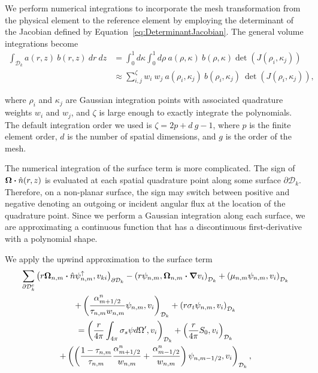 \documentclass[12pt]{article}
\begin{document}
We perform numerical integrations to incorporate the mesh transformation from the physical element to the reference element by employing the determinant of the Jacobian defined by Equation~\ref{eq:DeterminantJacobian}. The general volume integrations become
\begin{subequations}
\begin{flalign}
\int_{\mathcal{D}_k} a(r,z)\ b(r,z)\ dr\ dz & = \int_0^1 d \kappa \int_0^1 d \rho\ a(\rho,\kappa)\ b(\rho,\kappa) \det (J(\rho_{i},\kappa_{j})) \\
& \approx \sum_{i,j}^\zeta w_i\ w_j\ a(\rho_{i},\kappa_{j})\ b(\rho_{i},\kappa_{j})\ \det(J(\rho_{i},\kappa_{j})),
\end{flalign}
\end{subequations}

\noindent where $\rho_{i}$ and $\kappa_{j}$ are Gaussian integration points with associated quadrature weights $w_{i}$ and $w_{j}$, and $\zeta$ is large enough to exactly integrate the polynomials. The default integration order we used is $\zeta=2p+d\ g-1$, where $p$ is the finite element order, $d$ is the number of spatial dimensions, and $g$ is the order of the mesh.

The numerical integration of the surface term is more complicated. The sign of $\bm{\Omega} \bm{\cdot} \hat{n}(r,z)$ is evaluated at each spatial quadrature point along some surface $\partial \mathcal{D}_k$. Therefore, on a non-planar surface, the sign may switch between positive and negative denoting an outgoing or incident angular flux at the location of the quadrature point. Since we perform a Gaussian integration along each surface, we are approximating a continuous function that has a discontinuous first-derivative with a polynomial shape.

We apply the upwind approximation to the surface term
\begin{multline}
\sum_{\partial \mathcal{D}_k^e} \left(r \bm{\Omega}_{n,m} \bm{\cdot} \hat{n} \psi_{n,m}^\uparrow, v_{ki} \right)_{\partial \mathcal{D}_k} - \left(r \psi_{n,m}, \bm{\Omega}_{n,m} \bm{\cdot} \bm{\nabla} v_i \right)_{\mathcal{D}_k} + \left(\mu_{n,m} \psi_{n,m}, v_i \right)_{\mathcal{D}_k} \\
+ \left(\frac{\alpha_{m+1/2}^n}{\tau_{n,m} w_{n,m}} \psi_{n,m}, v_i \right)_{\mathcal{D}_k} + \left(r \sigma_t\psi_{n,m}, v_i \right)_{\mathcal{D}_k} \\
= \left(\frac{r}{4 \pi} \int_{4 \pi} \sigma_s \psi d \Omega^\prime, v_i \right)_{\mathcal{D}_k} + \left(\frac{r}{4 \pi} S_0, v_i \right)_{\mathcal{D}_k} \\
+ \left(\left(\frac{1-\tau_{n,m}}{\tau_{n,m}} \frac{\alpha_{m+1/2}^n}{w_{n,m}} + \frac{\alpha_{m-1/2}^n}{w_{n,m}} \right) \psi_{n,m-1/2}, v_i \right)_{\mathcal{D}_k},
\end{multline}
\end{document}
